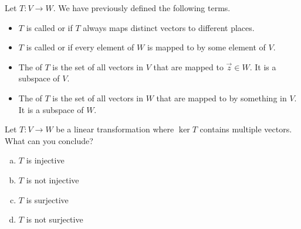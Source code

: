\begin{applicationActivities}

\begin{observation}
Let \(T: V \rightarrow W\).  We have previously defined the following
terms.
\begin{itemize}
\item  \(T\) is called  or  if \(T\) always maps  distinct vectors to different places.
\item \(T\) is called  or  if every element of \(W\) is mapped to by some element of \(V\).
\item The  of \(T\) is the set of all vectors in \(V\) that are mapped to \(\vec{z}\in W\).  It is a subspace of \(V\).
\item The  of \(T\) is the set of all vectors in \(W\) that are mapped to by something in \(V\).  It is a subspace of \(W\).
\end{itemize}
\end{observation}

\begin{activity}{5}
Let \(T: V \rightarrow W\) be a linear transformation where
\(\ker T\) contains multiple vectors. What can you conclude?
\begin{enumerate}[(a)]
\item \(T\) is injective
\item \(T\) is not injective
\item \(T\) is surjective
\item \(T\) is not surjective
\end{enumerate}
\end{activity}

\end{applicationActivities}
